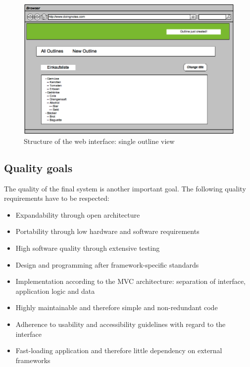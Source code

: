 \medskip
\begin{figure}[ht] 
  \begin{center}
  \includegraphics[width=\textwidth]{grafik/user-interface-mockup} 
  \end{center}
  \caption{Structure of the web interface: single outline view}
  \label{fig:interface-mockup} 
\end{figure}


\subsection{Quality goals}

The quality of the final system is another important goal. The following quality requirements have to be respected:

\begin{itemize}  
  \item Expandability through open architecture
  \item Portability through low hardware and software requirements
  \item High software quality through extensive testing
  \item Design and programming after framework-specific standards
  \item Implementation according to the MVC architecture: separation of interface, application logic and data
  \item Highly maintainable and therefore simple and non-redundant code
  \item Adherence to usability and accessibility guidelines with regard to the interface
  \item Fast-loading application and therefore little dependency on external frameworks
\end{itemize}